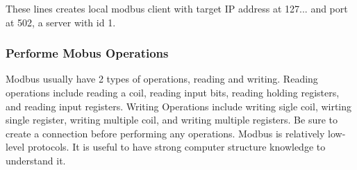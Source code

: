 These lines creates local modbus client with target IP address at 127... and port at 502, a server with id 1.

\subsubsection*{Performe Mobus Operations}

Modbus usually have 2 types of operations, reading and writing. Reading operations include reading a coil, reading input bits, reading holding registers, and reading input registers. Writing Operations include writing sigle coil, wirting single register, writing multiple coil, and writing multiple registers. Be sure to create a connection before performing any operations. Modbus is relatively low-\/level protocols. It is useful to have strong computer structure knowledge to understand it.



